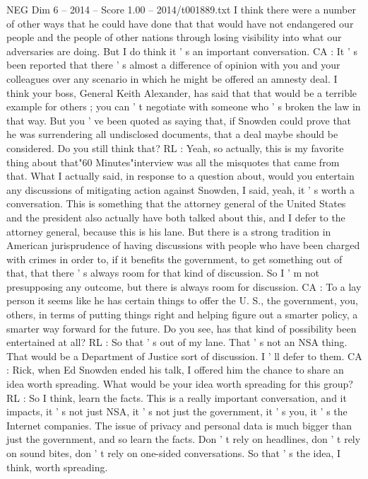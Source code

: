\begin{textsample}{NEG Dim 6 – 2014 – Score 1.00 – 2014/t001889.txt}
I think there were a number of other ways that he could have done that that would have not endangered our people and the people of other nations through losing visibility into what our adversaries are doing.
But I do think it ' s an important conversation.
CA : It ' s been reported that there ' s almost a difference of opinion with you and your colleagues over any scenario in which he might be offered an amnesty deal.
I think your boss, General Keith Alexander, has said that that would be a terrible example for others ; you can ' t negotiate with someone who ' s broken the law in that way.
But you ' ve been quoted as saying that, if Snowden could prove that he was surrendering all undisclosed documents, that a deal maybe should be considered.
Do you still think that?
RL : Yeah, so actually, this is my favorite thing about that"60 Minutes"interview was all the misquotes that came from that.
What I actually said, in response to a question about, would you entertain any discussions of mitigating action against Snowden, I said, yeah, it ' s worth a conversation.
This is something that the attorney general of the United States and the president also actually have both talked about this, and I defer to the attorney general, because this is his lane.
But there is a strong tradition in American jurisprudence of having discussions with people who have been charged with crimes in order to, if it benefits the government, to get something out of that, that there ' s always room for that kind of discussion.
So I ' m not presupposing any outcome, but there is always room for discussion.
CA : To a lay person it seems like he has certain things to offer the U.
S., the government, you, others, in terms of putting things right and helping figure out a smarter policy, a smarter way forward for the future.
Do you see, has that kind of possibility been entertained at all?
RL : So that ' s out of my lane.
That ' s not an NSA thing.
That would be a Department of Justice sort of discussion.
I ' ll defer to them.
CA : Rick, when Ed Snowden ended his talk, I offered him the chance to share an idea worth spreading.
What would be your idea worth spreading for this group?
RL : So I think, learn the facts.
This is a really important conversation, and it impacts, it ' s not just NSA, it ' s not just the government, it ' s you, it ' s the Internet companies.
The issue of privacy and personal data is much bigger than just the government, and so learn the facts.
Don ' t rely on headlines, don ' t rely on sound bites, don ' t rely on one-sided conversations.
So that ' s the idea, I think, worth spreading.

\end{textsample}
